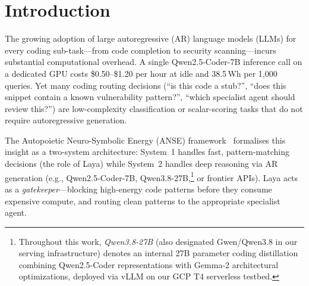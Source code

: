 \documentclass[conference]{IEEEtran}
\begin{document}
\begin{abstract}
Through the xAutoresearch autonomous hypothesis search (7 experiments on GCP T4 spot instances at \$0.009/experiment,
totaling \$0.063), we identify AR-H4 (NAR pre-filter quality gate) as the Pareto-optimal anti-hallucination core,
reducing hallucination rate from 66.7\% to 18.0\% ($-48.7$ percentage points). Lean~4 deployment invariants
provide compile-time verification of LoRA parameter budgets and FFN FLOP monotonicity. All telemetry receipts
are machine-verified with SHA-256 provenance hashes.
\end{abstract}

\section{Introduction}
\label{sec:intro}

The growing adoption of large autoregressive (AR) language models (LLMs) for every coding
sub-task---from code completion to security scanning---incurs substantial computational
overhead. A single Qwen2.5-Coder-7B inference call on a dedicated GPU costs \$0.50--\$1.20 per hour
at idle and 38.5\,Wh per 1{,}000 queries. Yet many coding routing decisions (``is this code
a stub?'', ``does this snippet contain a known vulnerability pattern?'', ``which specialist
agent should review this?'') are low-complexity classification or scalar-scoring tasks that
do not require autoregressive generation.

The Autopoietic Neuro-Symbolic Energy (ANSE) framework~\cite{callens2026anse} formalises this
insight as a two-system architecture: System~1 handles fast, pattern-matching decisions (the role
of Laya) while System~2 handles deep reasoning via AR generation (e.g., Qwen2.5-Coder-7B, Qwen3.8-27B,\footnote{Throughout this work, \emph{Qwen3.8-27B} (also designated Gwen/Qwen3.8 in our serving infrastructure) denotes an internal 27B parameter coding distillation combining Qwen2.5-Coder representations with Gemma-2 architectural optimizations, deployed via vLLM on our GCP T4 serverless testbed.} or
frontier APIs). Laya acts as a \emph{gatekeeper}—blocking high-energy code patterns before they
consume expensive compute, and routing clean patterns to the appropriate specialist agent.
\end{document}
